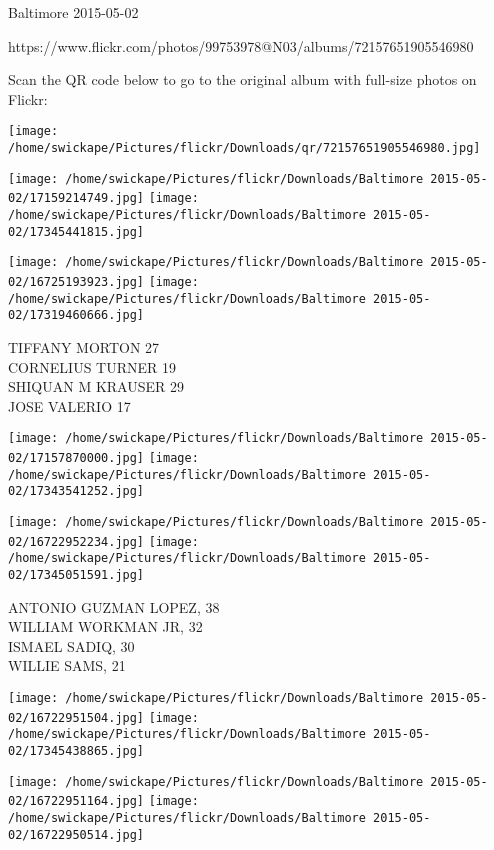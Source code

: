 \documentclass[10pt,letterpaper]{article}
\begin{document}
Baltimore 2015-05-02

https://www.flickr.com/photos/99753978@N03/albums/72157651905546980

Scan the QR code below to go to the original album with full-size photos on Flickr:

\texttt{[image: /home/swickape/Pictures/flickr/Downloads/qr/72157651905546980.jpg]}
\pagebreak

\texttt{[image: /home/swickape/Pictures/flickr/Downloads/Baltimore 2015-05-02/17159214749.jpg]}
\texttt{[image: /home/swickape/Pictures/flickr/Downloads/Baltimore 2015-05-02/17345441815.jpg]}

\texttt{[image: /home/swickape/Pictures/flickr/Downloads/Baltimore 2015-05-02/16725193923.jpg]}
\texttt{[image: /home/swickape/Pictures/flickr/Downloads/Baltimore 2015-05-02/17319460666.jpg]}

TIFFANY MORTON 27\\
CORNELIUS TURNER 19\\
SHIQUAN M KRAUSER 29\\
JOSE VALERIO 17\\
\pagebreak

\texttt{[image: /home/swickape/Pictures/flickr/Downloads/Baltimore 2015-05-02/17157870000.jpg]}
\texttt{[image: /home/swickape/Pictures/flickr/Downloads/Baltimore 2015-05-02/17343541252.jpg]}

\texttt{[image: /home/swickape/Pictures/flickr/Downloads/Baltimore 2015-05-02/16722952234.jpg]}
\texttt{[image: /home/swickape/Pictures/flickr/Downloads/Baltimore 2015-05-02/17345051591.jpg]}

ANTONIO GUZMAN LOPEZ, 38\\
WILLIAM WORKMAN JR, 32\\
ISMAEL SADIQ, 30\\
WILLIE SAMS, 21\\
\pagebreak

\texttt{[image: /home/swickape/Pictures/flickr/Downloads/Baltimore 2015-05-02/16722951504.jpg]}
\texttt{[image: /home/swickape/Pictures/flickr/Downloads/Baltimore 2015-05-02/17345438865.jpg]}

\texttt{[image: /home/swickape/Pictures/flickr/Downloads/Baltimore 2015-05-02/16722951164.jpg]}
\texttt{[image: /home/swickape/Pictures/flickr/Downloads/Baltimore 2015-05-02/16722950514.jpg]}
\end{document}
